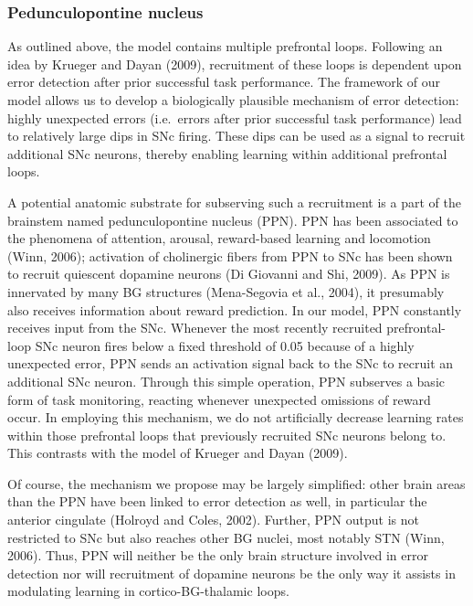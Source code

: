 \documentclass[
  11pt,
  a4paper,
]{scrbook}
\begin{document}
\subsubsection*{Pedunculopontine
nucleus}\label{pedunculopontine-nucleus}

As outlined above, the model contains multiple prefrontal loops.
Following an idea by Krueger and Dayan (2009), recruitment of these
loops is dependent upon error detection after prior successful task
performance. The framework of our model allows us to develop a
biologically plausible mechanism of error detection: highly unexpected
errors (i.e.~errors after prior successful task performance) lead to
relatively large dips in SNc firing. These dips can be used as a signal
to recruit additional SNc neurons, thereby enabling learning within
additional prefrontal loops.

A potential anatomic substrate for subserving such a recruitment is a
part of the brainstem named pedunculopontine nucleus (PPN). PPN has been
associated to the phenomena of attention, arousal, reward-based learning
and locomotion (Winn, 2006); activation of cholinergic fibers from PPN
to SNc has been shown to recruit quiescent dopamine neurons (Di Giovanni
and Shi, 2009). As PPN is innervated by many BG structures (Mena-Segovia
et al., 2004), it presumably also receives information about reward
prediction. In our model, PPN constantly receives input from the SNc.
Whenever the most recently recruited prefrontal-loop SNc neuron fires
below a fixed threshold of 0.05 because of a highly unexpected error,
PPN sends an activation signal back to the SNc to recruit an additional
SNc neuron. Through this simple operation, PPN subserves a basic form of
task monitoring, reacting whenever unexpected omissions of reward occur.
In employing this mechanism, we do not artificially decrease learning
rates within those prefrontal loops that previously recruited SNc
neurons belong to. This contrasts with the model of Krueger and Dayan
(2009).

Of course, the mechanism we propose may be largely simplified: other
brain areas than the PPN have been linked to error detection as well, in
particular the anterior cingulate (Holroyd and Coles, 2002). Further,
PPN output is not restricted to SNc but also reaches other BG nuclei,
most notably STN (Winn, 2006). Thus, PPN will neither be the only brain
structure involved in error detection nor will recruitment of dopamine
neurons be the only way it assists in modulating learning in
cortico-BG-thalamic loops.
\end{document}
